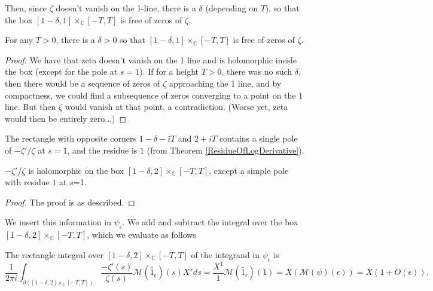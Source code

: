 Then, since $\zeta$ doesn't vanish on the 1-line, there is a $\delta$ (depending on $T$), so that the box $[1-\delta,1] \times_{ℂ} [-T,T]$ is free of zeros of $\zeta$.
\begin{theorem}\label{ZetaNoZerosInBox}
For any $T>0$, there is a $\delta>0$ so that $[1-\delta,1] \times_{ℂ} [-T,T]$ is free of zeros of $\zeta$.
\end{theorem}



\begin{proof}
We have that zeta doesn't vanish on the 1 line and is holomorphic inside the box (except for the pole at $s=1$). If for a height $T>0$, there was no such $\delta$, then there would be a sequence of zeros of $\zeta$ approaching the 1 line, and by compactness, we could find a subsequence of zeros converging to a point on the 1 line. But then $\zeta$ would vanish at that point, a contradiction. (Worse yet, zeta would then be entirely zero...)
\end{proof}



The rectangle with opposite corners $1-\delta - i T$ and $2+iT$ contains a single pole of $-\zeta'/\zeta$ at $s=1$, and the residue is $1$ (from Theorem \ref{ResidueOfLogDerivative}).
\begin{theorem}\label{ZeroFreeBox}
$-\zeta'/\zeta$ is holomorphic on the box $[1-\delta,2] \times_{ℂ} [-T,T]$, except a simple pole with residue $1$ at $s$=1.
\end{theorem}



\begin{proof}
The proof is as described.
\end{proof}



We insert this information in $\psi_{\epsilon}$. We add and subtract the integral over the box $[1-\delta,2] \times_{ℂ} [-T,T]$, which we evaluate as follows
\begin{theorem}\label{ZetaBoxEval}
The rectangle integral over $[1-\delta,2] \times_{ℂ} [-T,T]$ of the integrand in $\psi_{\epsilon}$ is
$$\frac{1}{2\pi i}\int_{\partial([1-\delta,2] \times_{ℂ} [-T,T])}\frac{-\zeta'(s)}{\zeta(s)}
\mathcal{M}(\widetilde{1_{\epsilon}})(s)
X^{s}ds = \frac{X^{1}}{1}\mathcal{M}(\widetilde{1_{\epsilon}})(1)
= X\left(\mathcal{M}(\psi)\left(\epsilon\right)\right)
= X(1+O(\epsilon))
.$$
\end{theorem}




